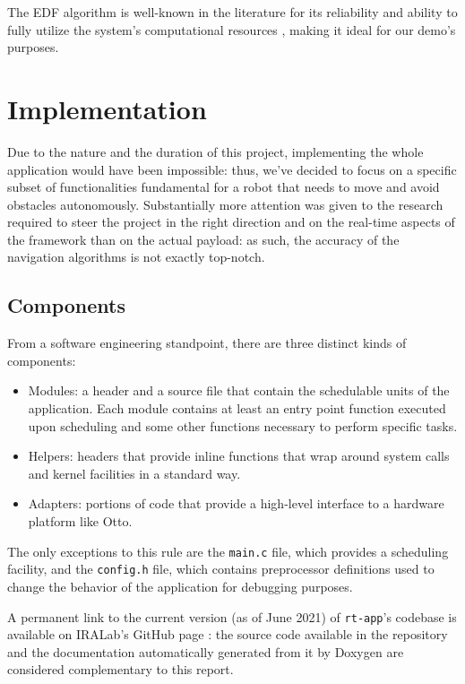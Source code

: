 \documentclass[a4paper,12pt]{report}
\begin{document}
The EDF algorithm is well-known in the literature for its reliability and ability to fully utilize the system's computational resources \cite{buttazzo-hard-rt}, making it ideal for our demo's purposes.

\section{Implementation}

Due to the nature and the duration of this project, implementing the whole application would have been impossible: thus, we've decided to focus on a specific subset of functionalities fundamental for a robot that needs to move and avoid obstacles autonomously. Substantially more attention was given to the research required to steer the project in the right direction and on the real-time aspects of the framework than on the actual payload: as such, the accuracy of the navigation algorithms is not exactly top-notch.

\subsection{Components}

From a software engineering standpoint, there are three distinct kinds of components:

\begin{itemize}
    \item Modules: a header and a source file that contain the schedulable units of the application. Each module contains at least an entry point function executed upon scheduling and some other functions necessary to perform specific tasks.   
    \item Helpers: headers that provide inline functions that wrap around system calls and kernel facilities in a standard way.
    \item Adapters: portions of code that provide a high-level interface to a hardware platform like Otto.
\end{itemize}

The only exceptions to this rule are the \texttt{main.c} file, which provides a scheduling facility, and the \texttt{config.h} file, which contains preprocessor definitions used to change the behavior of the application for debugging purposes.

A permanent link to the current version (as of June 2021) of \texttt{rt-app}'s codebase is available on IRALab's GitHub page \cite{rta-ira-repo}: the source code available in the repository and the documentation automatically generated from it by Doxygen are considered complementary to this report.
\end{document}
